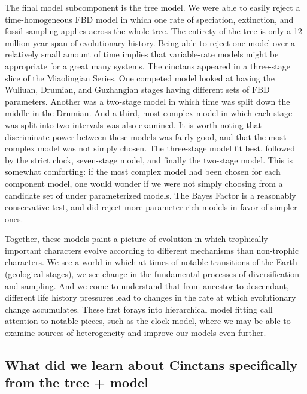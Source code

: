 \documentclass{article}
\begin{document}
The final model subcomponent is the tree model.
We were able to easily reject a time-homogeneous FBD model in which one rate of speciation, extinction, and fossil sampling applies across the whole tree.
The entirety of the tree is only a 12 million year span of evolutionary history.
Being able to reject one model over a relatively small amount of time implies that variable-rate models might be appropriate for a great many systems.
The cinctans appeared in a three-stage slice of the Miaolingian Series. 
One competed model looked at having the Wuliuan, Drumian, and Guzhangian stages having different sets of FBD parameters. 
Another was  a two-stage model in which time was split down the middle in the Drumian.
And a third, most complex model in which each stage was split into two intervals was also examined. 
It is worth noting that discriminate power between these models was fairly good, and that the most complex model was not simply chosen.
The three-stage model fit best, followed by the strict clock, seven-stage model, and finally the two-stage model. 
This is somewhat comforting: if the most complex model had been chosen for each component model, one would wonder if we were not simply choosing from a candidate set of under parameterized models. 
The Bayes Factor is a reasonably conservative test, and did reject more parameter-rich models in favor of simpler ones.

Together, these models paint a picture of evolution in which trophically-important characters evolve according to different mechanisms than non-trophic characters.
We see a world in which at times of notable transitions of the Earth (geological stages), we see change in the fundamental processes of diversification and sampling.
And we come to understand that from ancestor to descendant, different life history pressures lead to changes in the rate at which evolutionary change accumulates. 
These first forays into hierarchical model fitting call attention to notable pieces, such as the clock model, where we may be able to examine sources of heterogeneity and improve our models even further.

\subsection{What did we learn about Cinctans specifically from the tree + model}
\end{document}
